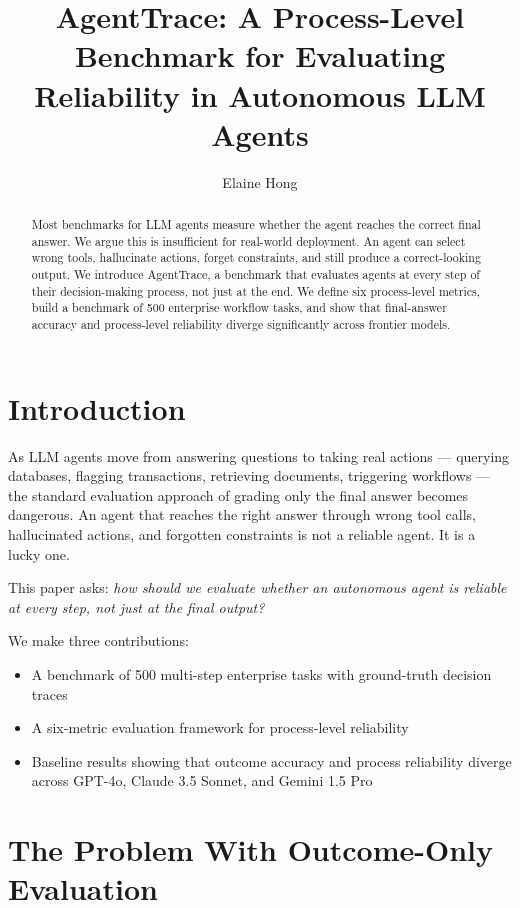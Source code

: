 \documentclass[11pt]{article}
\title{\textbf{AgentTrace: A Process-Level Benchmark for Evaluating Reliability in Autonomous LLM Agents}}
\author{Elaine Hong}
\date{}
\begin{document}
\maketitle

\begin{abstract}
Most benchmarks for LLM agents measure whether the agent reaches the correct final answer. We argue this is insufficient for real-world deployment. An agent can select wrong tools, hallucinate actions, forget constraints, and still produce a correct-looking output. We introduce AgentTrace, a benchmark that evaluates agents at every step of their decision-making process, not just at the end. We define six process-level metrics, build a benchmark of 500 enterprise workflow tasks, and show that final-answer accuracy and process-level reliability diverge significantly across frontier models.
\end{abstract}

\section{Introduction}

As LLM agents move from answering questions to taking real actions — querying databases, flagging transactions, retrieving documents, triggering workflows — the standard evaluation approach of grading only the final answer becomes dangerous. An agent that reaches the right answer through wrong tool calls, hallucinated actions, and forgotten constraints is not a reliable agent. It is a lucky one.

This paper asks: \textit{how should we evaluate whether an autonomous agent is reliable at every step, not just at the final output?}

We make three contributions:
\begin{itemize}
    \item A benchmark of 500 multi-step enterprise tasks with ground-truth decision traces
    \item A six-metric evaluation framework for process-level reliability
    \item Baseline results showing that outcome accuracy and process reliability diverge across GPT-4o, Claude 3.5 Sonnet, and Gemini 1.5 Pro
\end{itemize}

\section{The Problem With Outcome-Only Evaluation}
\end{document}
